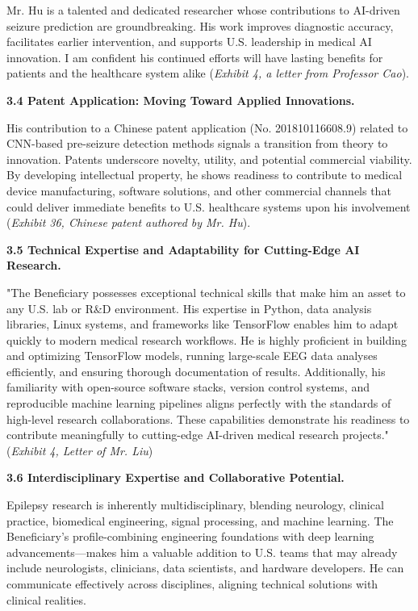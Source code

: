 \documentclass{article}
\begin{document}
Mr. Hu is a talented and dedicated researcher whose contributions to AI-driven seizure prediction are groundbreaking. His work improves diagnostic accuracy, facilitates earlier intervention, and supports U.S. leadership in medical AI innovation. I am confident his continued efforts will have lasting benefits for patients and the healthcare system alike ({\it Exhibit 4, a letter from Professor Cao}).

{\bf 3.4 Patent Application: Moving Toward Applied Innovations.}

His contribution to a Chinese patent application (No. 201810116608.9) related to CNN-based pre-seizure detection methods signals a transition from theory to innovation. Patents underscore novelty, utility, and potential commercial viability. By developing intellectual property, he shows readiness to contribute to medical device manufacturing, software solutions, and other commercial channels that could deliver immediate benefits to U.S. healthcare systems upon his involvement ({\it Exhibit 36, Chinese patent authored by Mr. Hu}).

{\bf 3.5 Technical Expertise and Adaptability for Cutting-Edge AI Research.}

"The Beneficiary possesses exceptional technical skills that make him an asset to any U.S. lab or R\&D environment. His expertise in Python, data analysis libraries, Linux systems, and frameworks like TensorFlow enables him to adapt quickly to modern medical research workflows. He is highly proficient in building and optimizing TensorFlow models, running large-scale EEG data analyses efficiently, and ensuring thorough documentation of results. Additionally, his familiarity with open-source software stacks, version control systems, and reproducible machine learning pipelines aligns perfectly with the standards of high-level research collaborations. These capabilities demonstrate his readiness to contribute meaningfully to cutting-edge AI-driven medical research projects." ({\it Exhibit 4, Letter of Mr. Liu})


{\bf 3.6 Interdisciplinary Expertise and Collaborative Potential.}

Epilepsy research is inherently multidisciplinary, blending neurology, clinical practice, biomedical engineering, signal processing, and machine learning. The Beneficiary’s profile-combining engineering foundations with deep learning advancements—makes him a valuable addition to U.S. teams that may already include neurologists, clinicians, data scientists, and hardware developers. He can communicate effectively across disciplines, aligning technical solutions with clinical realities.
\end{document}
